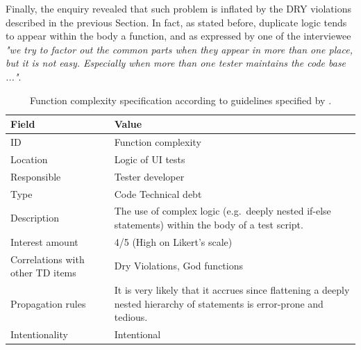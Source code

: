     Finally, the enquiry revealed that such problem is inflated by the DRY violations described in the previous Section. In fact, as stated before, duplicate logic tends to appear within the body a function, and as expressed by one of the interviewee \textit{"we try to factor out the common parts when they appear in more than one place, but it is not easy. Especially when more than one tester maintains the code base ..."}.



	\begin{table}[!htbp]
		\centering
		\tabulinesep=1.2mm
		\begin{tabu} to \textwidth {|X|X[3]|}

			\hline
			\textbf{Field} & \textbf{Value} \\
			\hline

			ID & Function complexity \\
			\hline

			Location & Logic of UI tests \\
			\hline

			Responsible & Tester developer \\
			\hline

			Type & Code Technical debt \\
			\hline

			Description & The use of complex logic (e.g.\ deeply nested if-else statements) within the body of a test script.\\
			\hline



			Interest amount &  4/5 (High on Likert's scale) \\
			\hline



			Correlations with other TD items & Dry Violations, God functions\\
			\hline



			Propagation rules & It is very likely that it accrues since flattening a deeply nested hierarchy of statements is error-prone and tedious.\\
			\hline

			Intentionality & Intentional \\
			\hline

		\end{tabu}
		\label{tab:res-function-complexity}
		\caption[Function complexity specification]{Function complexity specification according to guidelines specified by \cite{mapping_study_td}.}
	\end{table}
